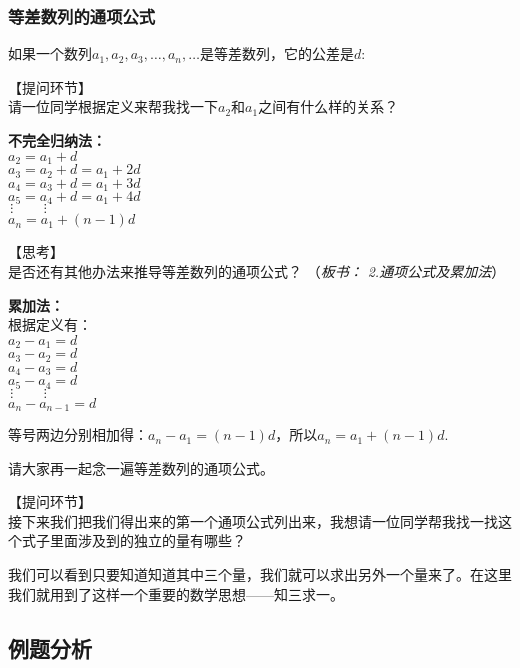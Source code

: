 \documentclass[10pt,a4paper]{article}
\begin{document}
			\subsubsection{等差数列的通项公式} 

				如果一个数列$a_1, a_2, a_3, \ldots, a_n, \ldots $是等差数列，它的公差是$d$: 

				【提问环节】\\
				请一位同学根据定义来帮我找一下$a_2$和$a_1$之间有什么样的关系？

				\textbf{不完全归纳法：}\\
				$a_2=a_1+d$\\ 
				$a_3=a_2+d=a_1+2d$\\
				$a_4=a_3+d=a_1+3d$\\
				$a_5=a_4+d=a_1+4d$\\
				$\hspace{2pt}\vdots \hspace{26pt} \vdots$\\
				$a_n=a_1+(n-1)d$

				【思考】\\
				是否还有其他办法来推导等差数列的通项公式？ （\emph{板书： 2.通项公式及累加法}）

				\textbf{累加法：}\\
				根据定义有：\\
				$a_2-a_1=d$\\ 
				$a_3-a_2=d$\\ 
				$a_4-a_3=d$\\ 
				$a_5-a_4=d$\\ 
				$\hspace{2pt}\vdots \hspace{26pt} \vdots$\\
				$a_n-a_{n-1}=d$

				等号两边分别相加得：$a_n-a_1=(n-1)d$，所以$a_n=a_1+(n-1)d$. 

				请大家再一起念一遍等差数列的通项公式。


				【提问环节】\\
				接下来我们把我们得出来的第一个通项公式列出来，我想请一位同学帮我找一找这个式子里面涉及到的独立的量有哪些？

				我们可以看到只要知道知道其中三个量，我们就可以求出另外一个量来了。在这里我们就用到了这样一个重要的数学思想——知三求一。



		\subsection{例题分析} %
		\label{sub:例题分析}
\end{document}
